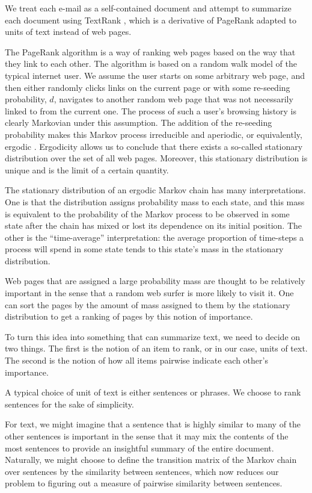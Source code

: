 We treat each e-mail as a self-contained document and attempt to summarize each document using TextRank \cite{textrank}, which is a derivative of PageRank \cite{pagerank} adapted to units of text instead of web pages.

The PageRank algorithm is a way of ranking web pages based on the way that they link to each other.
The algorithm is based on a random walk model of the typical internet user.
We assume the user starts on some arbitrary web page, and then either randomly clicks links on the current page or with some re-seeding probability, $d$, navigates to another random web page that was not necessarily linked to from the current one.
The process of such a user's browsing history is clearly Markovian under this assumption.
The addition of the re-seeding probability makes this Markov process irreducible and aperiodic, or equivalently, ergodic \cite{intro-prob-models-ross}. 
Ergodicity allows us to conclude that there exists a so-called stationary distribution over the set of all web pages.
Moreover, this stationary distribution is unique and is the limit of a certain quantity.

The stationary distribution of an ergodic Markov chain has many interpretations.
One is that the distribution assigns probability mass to each state, and this mass is equivalent to the probability of the Markov process to be observed in some state after the chain has mixed or lost its dependence on its initial position.
The other is the ``time-average'' interpretation: the average proportion of time-steps a process will spend in some state tends to this state's mass in the stationary distribution.

Web pages that are assigned a large probability mass are thought to be relatively important in the sense that a random web surfer is more likely to visit it.
One can sort the pages by the amount of mass assigned to them by the stationary distribution to get a ranking of pages by this notion of importance.

To turn this idea into something that can summarize text, we need to decide on two things.
The first is the notion of an item to rank, or in our case, units of text.
The second is the notion of how all items pairwise indicate each other's importance.

A typical choice of unit of text is either sentences or phrases.
We choose to rank sentences for the sake of simplicity.

For text, we might imagine that a sentence that is highly similar to many of the other sentences is important in the sense that it may mix the contents of the most sentences to provide an insightful summary of the entire document.
Naturally, we might choose to define the transition matrix of the Markov chain over sentences by the similarity between sentences, which now reduces our problem to figuring out a measure of pairwise similarity between sentences.

